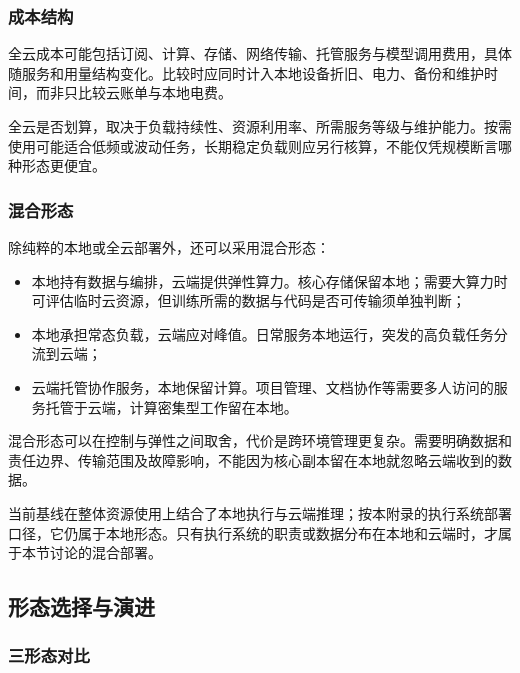 \documentclass[11pt,a4paper]{article}
\begin{document}
\subsubsection{成本结构}

全云成本可能包括订阅、计算、存储、网络传输、托管服务与模型调用费用，具体随服务和用量结构变化。比较时应同时计入本地设备折旧、电力、备份和维护时间，而非只比较云账单与本地电费。

全云是否划算，取决于负载持续性、资源利用率、所需服务等级与维护能力。按需使用可能适合低频或波动任务，长期稳定负载则应另行核算，不能仅凭规模断言哪种形态更便宜。

\subsubsection{混合形态}

除纯粹的本地或全云部署外，还可以采用混合形态：

\begin{itemize}[leftmargin=2em,itemsep=2pt]
  \item 本地持有数据与编排，云端提供弹性算力。核心存储保留本地；需要大算力时可评估临时云资源，但训练所需的数据与代码是否可传输须单独判断；
  \item 本地承担常态负载，云端应对峰值。日常服务本地运行，突发的高负载任务分流到云端；
  \item 云端托管协作服务，本地保留计算。项目管理、文档协作等需要多人访问的服务托管于云端，计算密集型工作留在本地。
\end{itemize}

混合形态可以在控制与弹性之间取舍，代价是跨环境管理更复杂。需要明确数据和责任边界、传输范围及故障影响，不能因为核心副本留在本地就忽略云端收到的数据。

当前基线在整体资源使用上结合了本地执行与云端推理；按本附录的执行系统部署口径，它仍属于本地形态。只有执行系统的职责或数据分布在本地和云端时，才属于本节讨论的混合部署。

\subsection{形态选择与演进}

\subsubsection{三形态对比}
\end{document}
